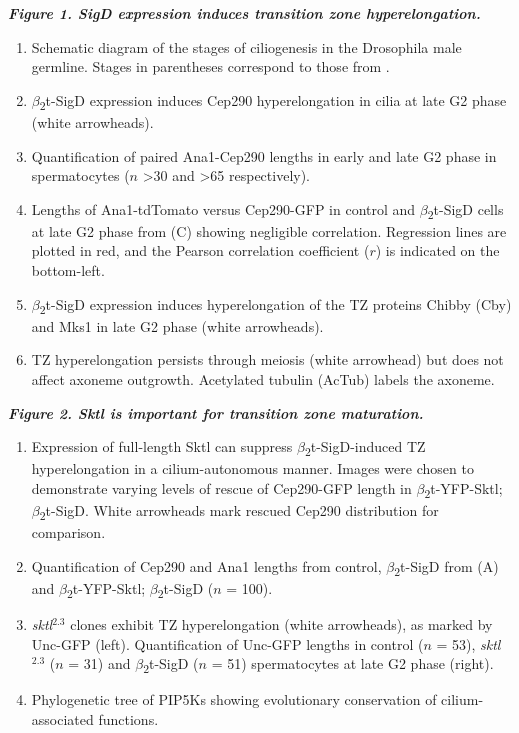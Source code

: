 \documentclass[12pt, twoside, letterpaper]{article}
\newcommand{\sigd}{$\beta$\textsubscript{2}t-SigD}
\begin{document}
\begin{doublespacing}
\begin{linenumbers}
    \textbf{\itshape Figure 1. SigD expression induces transition zone hyperelongation.}
    \begin{enumerate}[label={(\Alph*)}, nolistsep]
    \item Schematic diagram of the stages of ciliogenesis in the Drosophila male germline.
      Stages in parentheses correspond to those from \citep{cenci1994chromatin}.
    \item \sigd{} expression induces Cep290 hyperelongation in cilia at late G2 phase (white arrowheads).
    \item Quantification of paired Ana1-Cep290 lengths in early and late G2 phase in spermatocytes ($n$ >30 and >65 respectively).
    \item Lengths of Ana1-tdTomato versus Cep290-GFP in control and \sigd{} cells at late G2 phase from (C) showing negligible correlation.
      Regression lines are plotted in red, and the Pearson correlation coefficient ($r$) is indicated on the bottom-left.
    \item \sigd{} expression induces hyperelongation of the TZ proteins Chibby (Cby) and Mks1 in late G2 phase (white arrowheads).
    \item TZ hyperelongation persists through meiosis (white arrowhead) but does not affect
      axoneme outgrowth. Acetylated tubulin (AcTub) labels the axoneme.
    \end{enumerate}
    \bigskip
    \textbf{\itshape Figure 2. Sktl is important for transition zone maturation.}
    \begin{enumerate}[label={(\Alph*)}, nolistsep]
    \item Expression of full-length Sktl can suppress \sigd{}-induced TZ hyperelongation in a cilium-autonomous manner.
      Images were chosen to demonstrate varying levels of rescue of Cep290-GFP length in $\beta$\textsubscript{2}t-YFP-Sktl; \sigd{}.
      White arrowheads mark rescued Cep290 distribution for comparison.
    \item Quantification of Cep290 and Ana1 lengths from control, \sigd{} from (A) and $\beta$\textsubscript{2}t-YFP-Sktl; \sigd{} ($n$ = 100).
    \item \textit{sktl}$^{2.3}$ clones exhibit TZ hyperelongation (white arrowheads), as marked by
      Unc-GFP (left). Quantification of Unc-GFP lengths in control ($n$ = 53), \textit{sktl}$^{2.3}$ ($n$ = 31) and \sigd{}  ($n$ = 51)
      spermatocytes at late G2 phase (right).
    \item Phylogenetic tree of PIP5Ks showing evolutionary conservation of cilium-associated functions.

\end{enumerate}
\end{linenumbers}
\end{doublespacing}
\end{document}
